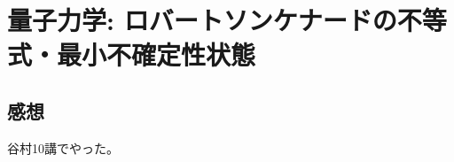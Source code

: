 \documentclass[../../sp_2021.tex]{subfiles}
\begin{document}
\setcounter{section}{0}
\section{量子力学: ロバートソンケナードの不等式・最小不確定性状態}
\subsection{}



\subsection*{感想}
谷村10講でやった。
\end{document}
